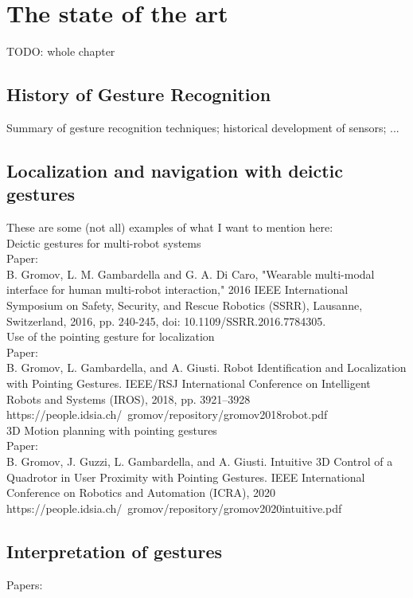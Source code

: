 \chapter{The state of the art}

TODO: whole chapter\\
\section{History of Gesture Recognition}
Summary of gesture recognition techniques;
historical development of sensors;
...

\section{Localization and navigation with deictic gestures}

These are some (not all) examples of what I want to mention here:\\
 
Deictic gestures for multi-robot systems \\

Paper: \\
B. Gromov, L. M. Gambardella and G. A. Di Caro, "Wearable multi-modal interface for human multi-robot interaction," 2016 IEEE International Symposium on Safety, Security, and Rescue Robotics (SSRR), Lausanne, Switzerland, 2016, pp. 240-245, doi: 10.1109/SSRR.2016.7784305.\\

Use of the pointing gesture for localization \\

Paper: \\
B. Gromov, L. Gambardella, and A. Giusti. Robot Identification and Localization with Pointing Gestures. IEEE/RSJ International Conference on Intelligent Robots and Systems (IROS), 2018, pp. 3921–3928 https://people.idsia.ch/~gromov/repository/gromov2018robot.pdf \\

3D Motion planning with pointing gestures \\

Paper: \\
B. Gromov, J. Guzzi, L. Gambardella, and A. Giusti. Intuitive 3D Control of a Quadrotor in User Proximity with Pointing Gestures. IEEE International Conference on Robotics and Automation (ICRA), 2020 https://people.idsia.ch/~gromov/repository/gromov2020intuitive.pdf

\section{Interpretation of gestures}
Papers:\\

